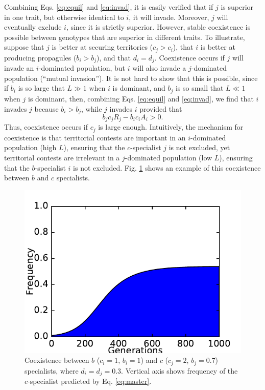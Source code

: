 \documentclass[11pt]{article}
\begin{document}
Combining Eqs. \eqref{eq:equil} and \eqref{eq:invad}, it is easily verified that if $j$ is superior in one trait, but otherwise identical to $i$, it will invade. Moreover, $j$ will eventually exclude $i$, since it is strictly superior. However, stable coexistence is possible between genotypes that are superior in different traits. To illustrate, suppose that $j$ is better at securing territories ($c_j>c_i$), that $i$ is better at producing propagules ($b_i>b_j$), and that $d_i=d_j$. Coexistence occurs if $j$ will invade an $i$-dominated population, but $i$ will also invade a $j$-dominated population (``mutual invasion''). It is not hard to show that this is possible, since if $b_i$ is so large that $L\gg 1$ when $i$ is dominant, and $b_j$ is so small that $L\ll 1$ when $j$ is dominant, then, combining Eqs. \eqref{eq:equil} and \eqref{eq:invad}, we find that $i$ invades $j$ because $b_i>b_j$, while $j$ invades $i$ provided that
\begin{equation}
b_jc_jR_j-b_i c_i A_i>0. \label{eq:jinvadcoex}
\end{equation}
Thus, coexistence occurs if $c_j$ is large enough. Intuitively, the mechanism for coexistence is that territorial contests are important in an $i$-dominated population (high $L$), ensuring that the $c$-specialist $j$ is not excluded, yet territorial contests are irrelevant in a $j$-dominated population (low $L$), ensuring that the $b$-specialist $i$ is not excluded. Fig. \ref{fig:coex} shows an example of this coexistence between $b$ and $c$ specialists. 

\begin{figure}
\centering
\includegraphics[scale=0.7]{coex.pdf}
\caption{\label{fig:coex} Coexistence between $b$ ($c_i=1$, $b_i=1$) and $c$ ($c_j=2$, $b_j=0.7$) specialists, where $d_i=d_j=0.3$. Vertical axis shows frequency of the $c$-specialist predicted by Eq. \eqref{eq:master}.} 
\end{figure}
\end{document}
